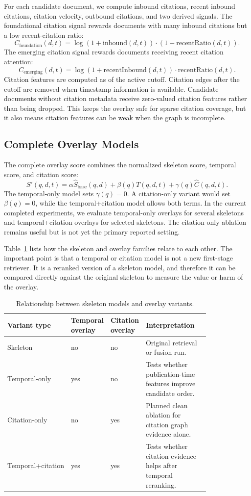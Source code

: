 \documentclass[11pt]{article}
\begin{document}
For each candidate document, we compute inbound citations, recent inbound citations, citation velocity, outbound citations, and two derived signals. The foundational citation signal rewards documents with many inbound citations but a low recent-citation ratio:
\[
C_{\mathrm{foundation}}(d,t) = \log(1+\mathrm{inbound}(d,t))\cdot(1-\mathrm{recentRatio}(d,t)).
\]
The emerging citation signal rewards documents receiving recent citation attention:
\[
C_{\mathrm{emerging}}(d,t) = \log(1+\mathrm{recentInbound}(d,t))\cdot \mathrm{recentRatio}(d,t).
\]
Citation features are computed as of the active cutoff. Citation edges after the cutoff are removed when timestamp information is available. Candidate documents without citation metadata receive zero-valued citation features rather than being dropped. This keeps the overlay safe for sparse citation coverage, but it also means citation features can be weak when the graph is incomplete.

\subsection{Complete Overlay Models}

The complete overlay score combines the normalized skeleton score, temporal score, and citation score:
\[
S'(q,d,t) = \alpha \widehat{S}_{\mathrm{base}}(q,d)
          + \beta(q) \widehat{T}(q,d,t)
          + \gamma(q) \widehat{C}(q,d,t).
\]
The temporal-only model sets $\gamma(q)=0$. A citation-only variant would set $\beta(q)=0$, while the temporal+citation model allows both terms. In the current completed experiments, we evaluate temporal-only overlays for several skeletons and temporal+citation overlays for selected skeletons. The citation-only ablation remains useful but is not yet the primary reported setting.

Table~\ref{tab:overlay-models} lists how the skeleton and overlay families relate to each other. The important point is that a temporal or citation model is not a new first-stage retriever. It is a reranked version of a skeleton model, and therefore it can be compared directly against the original skeleton to measure the value or harm of the overlay.

\begin{table}[ht]
\centering
\caption{Relationship between skeleton models and overlay variants.}
\label{tab:overlay-models}
\small
\begin{tabular}{p{0.22\linewidth}p{0.14\linewidth}p{0.14\linewidth}p{0.32\linewidth}}
\toprule
Variant type & Temporal overlay & Citation overlay & Interpretation \\
\midrule
Skeleton & no & no & Original retrieval or fusion run. \\
Temporal-only & yes & no & Tests whether publication-time features improve candidate order. \\
Citation-only & no & yes & Planned clean ablation for citation graph evidence alone. \\
Temporal+citation & yes & yes & Tests whether citation evidence helps after temporal reranking. \\
\bottomrule
\end{tabular}
\normalsize
\end{table}
\end{document}
